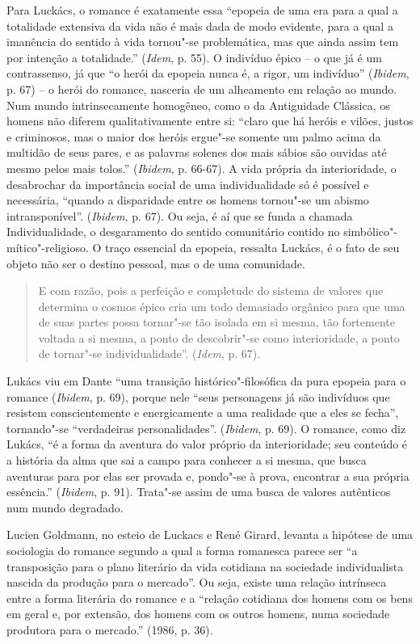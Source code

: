 {Para Luckács, o romance é exatamente essa ``epopeia de uma era para a
qual a totalidade extensiva da vida não é mais dada de modo evidente,
para a qual a imanência do sentido à vida tornou"-se problemática, mas
que ainda assim tem por intenção a totalidade.'' (\emph{Idem}, p. 55). O
indivíduo épico -- o que já é um contrassenso, já que ``o herói da
epopeia nunca é, a rigor, um indivíduo'' (\emph{Ibidem}, p. 67) -- o
herói do romance, nasceria de um alheamento em relação ao mundo. Num
mundo intrinsecamente homogêneo, como o da Antiguidade Clássica, os
homens não diferem qualitativamente entre si: ``claro que há heróis e
vilões, justos e criminosos, mas o maior dos heróis ergue"-se somente um
palmo acima da multidão de seus pares, e as palavras solenes dos mais
sábios são ouvidas até mesmo pelos mais tolos.'' (\emph{Ibidem}, p.
66-67). A vida própria da interioridade, o desabrochar da importância
social de uma individualidade só é possível e necessária, ``quando a
disparidade entre os homens tornou"-se um abismo intransponível''.
(\emph{Ibidem,} p. 67). Ou seja, é aí que se funda a chamada
Individualidade, o desgaramento do sentido comunitário contido no
simbólico"-mítico"-religioso. O traço essencial da epopeia, ressalta
Luckács, é o fato de seu objeto não ser o destino pessoal, mas o de uma
comunidade.

\begin{quote}
E com razão, pois a perfeição e completude do sistema de valores que
determina o cosmos épico cria um todo demasiado orgânico para que uma de
suas partes possa tornar"-se tão isolada em si mesma, tão fortemente
voltada a si mesma, a ponto de descobrir"-se como interioridade, a ponto
de tornar"-se individualidade''. (\emph{Idem}, p. 67).
\end{quote}

Lukács viu em Dante ``uma transição histórico"-filosófica da pura epopeia
para o romance (\emph{Ibidem}, p. 69), porque nele ``seus personagens já
são indivíduos que resistem conscientemente e energicamente a uma
realidade que a eles se fecha'', tornando"-se ``verdadeiras
personalidades''. (\emph{Ibidem}, p. 69). O romance, como diz Lukács,
``é a forma da aventura do valor próprio da interioridade; seu conteúdo
é a história da alma que sai a campo para conhecer a si mesma, que busca
aventuras para por elas ser provada e, pondo"-se à prova, encontrar a sua
própria essência.'' (\emph{Ibidem}, p. 91). Trata"-se assim de uma busca
de valores autênticos num mundo degradado.

Lucien Goldmann, no esteio de Luckacs e René Girard, levanta a hipótese
de uma sociologia do romance segundo a qual a forma romanesca parece ser
``a transposição para o plano literário da vida cotidiana na sociedade
individualista nascida da produção para o mercado''. Ou seja, existe uma
relação intrínseca entre a forma literária do romance e a ``relação
cotidiana dos homens com os bens em geral e, por extensão, dos homens
com os outros homens, numa sociedade produtora para o mercado.'' (1986,
p. 36).

}
